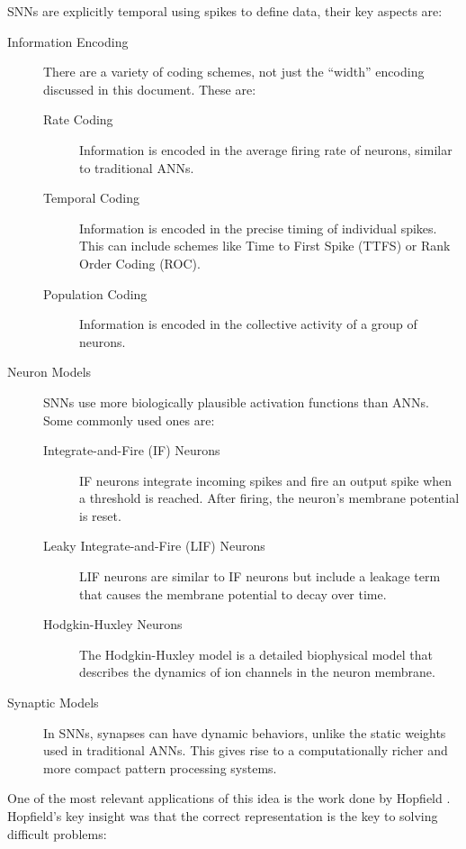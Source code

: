 \documentclass{article}
\begin{document}
SNNs are explicitly temporal using spikes to define data, their key aspects are:

\begin{description}
	\item[Information Encoding] There are a variety of coding schemes, not just the ``width'' encoding discussed in this document. These are:
	      \begin{description}
		      \item[Rate Coding] Information is encoded in the average firing rate of neurons, similar to traditional ANNs.
		      \item[Temporal Coding] Information is encoded in the precise timing of individual spikes. This can include schemes like Time to First Spike (TTFS) or Rank Order Coding (ROC).
		      \item[Population Coding] Information is encoded in the collective activity of a group of neurons.
	      \end{description}
	      
	\item[Neuron Models] SNNs use more biologically plausible activation functions than ANNs. Some commonly used ones are:
	      \begin{description}
		      \item[Integrate-and-Fire (IF) Neurons] \cite{burkitt2006review} IF neurons integrate incoming spikes and fire an output spike when a threshold is reached. After firing, the neuron's membrane potential is reset.
		      \item[Leaky Integrate-and-Fire (LIF) Neurons] \cite{tal1997computing} LIF neurons are similar to IF neurons but include a leakage term that causes the membrane potential to decay over time.
		      \item[Hodgkin-Huxley Neurons] \cite{y2003computation} The Hodgkin-Huxley model is a detailed biophysical model that describes the dynamics of ion channels in the neuron membrane.
	      \end{description}
	\item[Synaptic Models] In SNNs, synapses can have dynamic behaviors, unlike the static weights used in traditional ANNs. This gives rise to a computationally richer and more compact pattern processing systems.
\end{description}

One of the most relevant applications of this idea is the work done by Hopfield \cite{hopfield1995pattern}. Hopfield's key insight was that the correct representation is the key to solving difficult problems:
\end{document}
